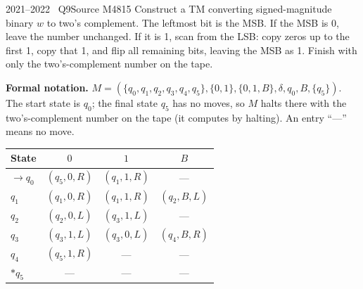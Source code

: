 \documentclass[11pt,a4paper]{article}
\begin{document}
\begin{question}{2021--2022 \textbullet\ Q9}{Source M48}{15}
Construct a TM converting signed-magnitude binary $w$ to two's complement. The leftmost bit is the MSB. If the MSB is 0, leave the number unchanged. If it is 1, scan from the LSB: copy zeros up to the first 1, copy that 1, and flip all remaining bits, leaving the MSB as 1. Finish with only the two's-complement number on the tape.
\end{question}
\begin{solution}
\textbf{Formal notation.} $M=(\{q_0,q_1,q_2,q_3,q_4,q_5\},\{0,1\},\{0,1,B\},\delta,q_0,B,\{q_5\})$. The start state is $q_0$; the final state $q_5$ has no moves, so $M$ halts there with the two's-complement number on the tape (it computes by halting). An entry ``---'' means no move.
\begin{center}\small\begin{tabular}{l|ccc}\toprule
State & $0$ & $1$ & $B$\\\midrule
$\to q_0$ & $(q_5,0,R)$ & $(q_1,1,R)$ & ---\\
$q_1$ & $(q_1,0,R)$ & $(q_1,1,R)$ & $(q_2,B,L)$\\
$q_2$ & $(q_2,0,L)$ & $(q_3,1,L)$ & ---\\
$q_3$ & $(q_3,1,L)$ & $(q_3,0,L)$ & $(q_4,B,R)$\\
$q_4$ & $(q_5,1,R)$ & --- & ---\\
$*q_5$ & --- & --- & ---\\\bottomrule\end{tabular}\end{center}
\end{solution}
\end{document}
